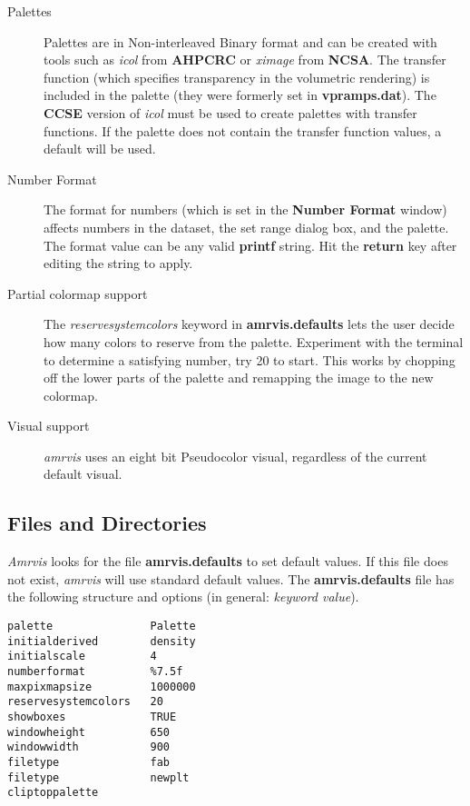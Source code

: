 \documentclass{article}
\begin{document}
\begin{description}
\item [Palettes]
Palettes are in Non-interleaved Binary format and can be created
with tools such as {\em icol} from {\bf AHPCRC} or {\em ximage}
from {\bf NCSA}.  The transfer function (which specifies transparency
in the volumetric rendering) is included in the palette (they were
formerly set in {\bf vpramps.dat}).
The {\bf CCSE} version of {\em icol} must be used to create palettes
with transfer functions.
If the palette does not contain the transfer function values,
a default will be used.


\item [Number Format] The format for numbers (which is set in the
{\bf Number Format} window) affects numbers in the dataset, the set range
dialog box, and the palette.  The format value can be any valid {\bf printf}
string.  Hit the {\bf return} key after editing the string to apply.

\item [Partial colormap support]   The {\em reservesystemcolors} keyword
in {\bf amrvis.defaults} lets the user decide how many colors
to reserve from the palette.   Experiment with the terminal
to determine a satisfying number, try 20 to start.  This works
by chopping off the lower parts of the palette and remapping the
image to the new colormap.

\item [Visual support]
{\em amrvis} uses an eight bit Pseudocolor visual, regardless of the
current default visual.

\end{description}



\subsection{Files and Directories}

{\em Amrvis} looks for the file {\bf amrvis.defaults} to set default values.
If this file does not exist, {\em amrvis} will use standard default values.
The {\bf amrvis.defaults} file has the following structure and options
(in general: {\em keyword   value}).


\begin{verbatim}
palette               Palette
initialderived        density
initialscale          4
numberformat          %7.5f
maxpixmapsize         1000000
reservesystemcolors   20
showboxes             TRUE
windowheight          650
windowwidth           900
filetype              fab
filetype              newplt
cliptoppalette
\end{verbatim}
\end{document}
